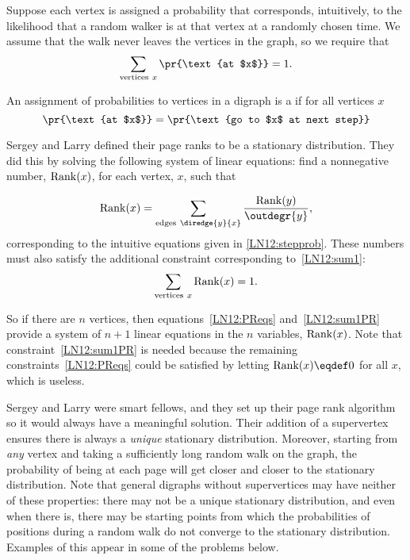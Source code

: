 Suppose each vertex is assigned a probability that corresponds, intuitively,
to the likelihood that a random walker is at that vertex at a randomly
chosen time.  We assume that the walk never leaves the vertices in the graph,
so we require that
\begin{equation}\label{LN12:sum1}
\sum_{\text{vertices}\ x} \pr{\text{at $x$}} = 1.
\end{equation}

\begin{definition} An assignment of probabilities to vertices in a digraph
  is a  if for all vertices $x$
\[
\pr{\text{at $x$}} = \pr{\text{go to $x$ at next step}}
\]
\end{definition}  

Sergey and Larry defined their page ranks to be a stationary distribution.
They did this by solving the following system of linear equations: find a
nonnegative number, $\operatorname{Rank}(x)$, for each vertex, $x$, such that

\begin{equation}\label{LN12:PReqs}
\PRnk(x) = \sum_{\text{edges}\ \diredge{y}{x}} \frac{\PRnk(y)}{\outdegr{y}},
\end{equation}
corresponding to the intuitive equations given in \eqref{LN12:stepprob}.
These numbers must also satisfy the additional constraint corresponding
to~\eqref{LN12:sum1}:
\begin{equation}\label{LN12:sum1PR}
\sum_{\text{vertices}\ x} \operatorname{Rank}(x) = 1.
\end{equation}

So if there are $n$ vertices, then equations~\eqref{LN12:PReqs}
and~\eqref{LN12:sum1PR} provide a system of $n+1$ linear equations in the
$n$ variables, $\operatorname{Rank}(x)$.  Note that constraint~\eqref{LN12:sum1PR}
is needed because the remaining constraints~\eqref{LN12:PReqs} could be
satisfied by letting $\PRnk(x)\eqdef 0$ for all $x$, which is useless.

Sergey and Larry were smart fellows, and they set up their page rank
algorithm so it would always have a meaningful solution.  Their addition
of a supervertex ensures there is always a \emph{unique} stationary
distribution.  Moreover, starting from \emph{any} vertex and taking a
sufficiently long random walk on the graph, the probability of being at
each page will get closer and closer to the stationary distribution.  Note
that general digraphs without supervertices may have neither of these
properties: there may not be a unique stationary distribution, and even
when there is, there may be starting points from which the probabilities
of positions during a random walk do not converge to the stationary
distribution.  Examples of this appear in some of the problems below.

